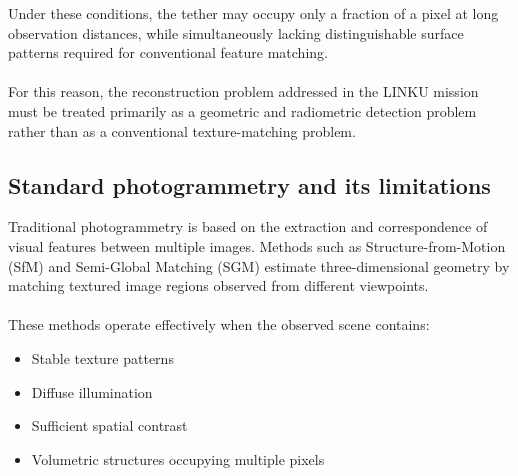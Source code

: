 Under these conditions, the tether may occupy only a fraction of a pixel at long observation distances, while simultaneously lacking distinguishable surface patterns required for conventional feature matching.
\\\\
For this reason, the reconstruction problem addressed in the LINKU mission must be treated primarily as a geometric and radiometric detection problem rather than as a conventional texture-matching problem.

\subsection{Standard photogrammetry and its limitations}

Traditional photogrammetry is based on the extraction and correspondence of visual features between multiple images. Methods such as Structure-from-Motion (SfM) and Semi-Global Matching (SGM) estimate three-dimensional geometry by matching textured image regions observed from different viewpoints.
\\\\
These methods operate effectively when the observed scene contains:
\begin{itemize}
    \item Stable texture patterns
    \item Diffuse illumination
    \item Sufficient spatial contrast
    \item Volumetric structures occupying multiple pixels
\end{itemize}

